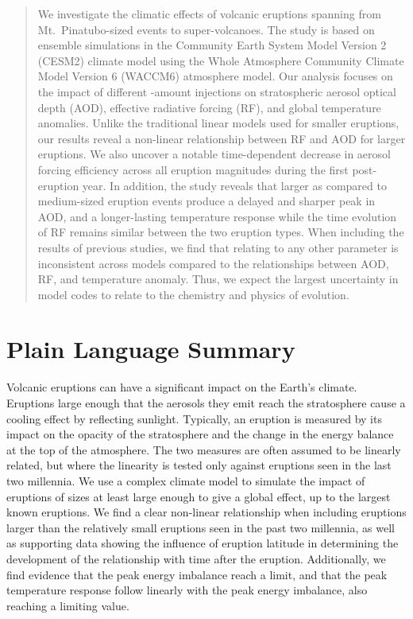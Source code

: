 \documentclass[draft]{agujournal2019}
\begin{document}
\begin{abstract}
  We investigate the climatic effects of volcanic eruptions spanning from Mt.\
  Pinatubo-sized events to super-volcanoes. The study is based on ensemble simulations
  in the Community Earth System Model Version 2 (CESM2) climate model using the Whole
  Atmosphere Community Climate Model Version 6 (WACCM6) atmosphere model. Our analysis
  focuses on the impact of different \ce{SO2}-amount injections on stratospheric aerosol
  optical depth (AOD), effective radiative forcing (RF), and global temperature
  anomalies. Unlike the traditional linear models used for smaller eruptions, our
  results reveal a non-linear relationship between RF and AOD for larger eruptions. We
  also uncover a notable time-dependent decrease in aerosol forcing efficiency across
  all eruption magnitudes during the first post-eruption year. In addition, the study
  reveals that larger as compared to medium-sized eruption events produce a delayed and
  sharper peak in AOD, and a longer-lasting temperature response while the time
  evolution of RF remains similar between the two eruption types. When including the
  results of previous studies, we find that relating \ce{SO2} to any other parameter is
  inconsistent across models compared to the relationships between AOD, RF, and
  temperature anomaly. Thus, we expect the largest uncertainty in model codes to relate
  to the chemistry and physics of \ce{SO2} evolution.
\end{abstract}

\section*{Plain Language Summary}


Volcanic eruptions can have a significant impact on the Earth's climate. Eruptions large
enough that the aerosols they emit reach the stratosphere cause a cooling effect by
reflecting sunlight. Typically, an eruption is measured by its impact on the opacity of
the stratosphere and the change in the energy balance at the top of the atmosphere. The
two measures are often assumed to be linearly related, but where the linearity is tested
only against eruptions seen in the last two millennia. We use a complex climate model to
simulate the impact of eruptions of sizes at least large enough to give a global effect,
up to the largest known eruptions. We find a clear non-linear relationship when
including eruptions larger than the relatively small eruptions seen in the past two
millennia, as well as supporting data showing the influence of eruption latitude in
determining the development of the relationship with time after the eruption.
Additionally, we find evidence that the peak energy imbalance reach a limit, and that
the peak temperature response follow linearly with the peak energy imbalance, also
reaching a limiting value.
\end{document}
